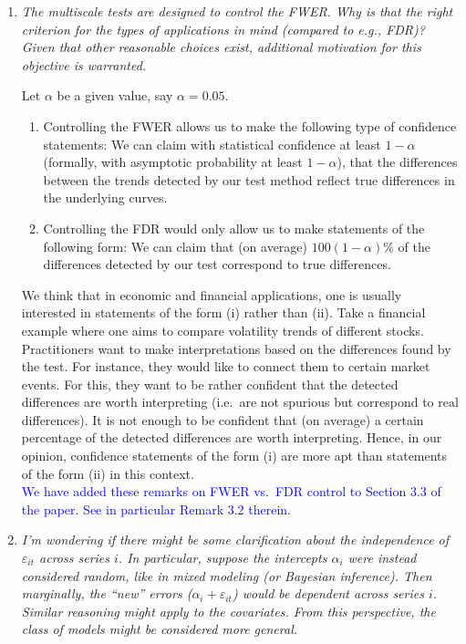 \documentclass[a4paper,12pt]{article}
\begin{document}
\begin{enumerate}[label=\arabic*.,leftmargin=0.6cm]
  
\item \textit{The multiscale tests are designed to control the FWER. Why is that the right criterion for the types of applications in mind (compared to e.g., FDR)? Given that other reasonable choices exist, additional motivation for this objective is warranted.}

Let $\alpha$ be a given value, say $\alpha = 0.05$. 
\begin{enumerate}[label=(\roman*),leftmargin=0.75cm,topsep=0pt]
\item Controlling the FWER allows us to make the following type of confidence statements: We can claim with statistical confidence at least $1-\alpha$ (formally, with asymptotic probability at least $1-\alpha$), that the differences between the trends detected by our test method reflect true differences in the underlying curves. 
\item Controlling the FDR would only allow us to make statements of the following form: We can claim that (on average) $100(1-\alpha) \%$ of the differences detected by our test correspond to true differences.
\end{enumerate}
We think that in economic and financial applications, one is usually interested in statements of the form (i) rather than (ii). Take a financial example where one aims to compare volatility trends of different stocks. Practitioners want to make interpretations based on the differences found by the test. For instance, they would like to connect them to certain market events. For this, they want to be rather confident that the detected differences are worth interpreting (i.e.\ are not spurious but correspond to real differences). It is not enough to be confident that (on average) a certain percentage of the detected differences are worth interpreting. Hence, in our opinion, confidence statements of the form (i) are more apt than statements of the form (ii) in this context. \\
\textcolor{blue}{We have added these remarks on FWER vs.\ FDR control to Section 3.3 of the paper. See in particular Remark 3.2 therein.}


\item \textit{I'm wondering if there might be some clarification about the independence of $\varepsilon_{it}$ across series $i$. In particular, suppose the intercepts $\alpha_i$ were instead considered random, like in mixed modeling (or Bayesian inference). Then marginally, the ``new'' errors ($\alpha_i + \varepsilon_{it}$) would be dependent across series $i$. Similar reasoning might apply to the covariates. From this perspective, the class of models might be considered more general.}


\end{enumerate}
\end{document}
